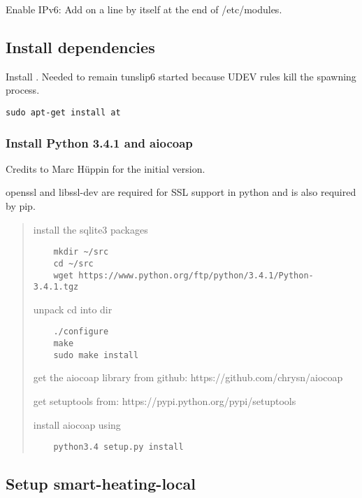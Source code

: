 Enable IPv6: Add  on a line by itself at the end of
/etc/modules.

\subsection{Install dependencies}\label{install-dependencies}

Install . Needed to remain tunslip6 started because UDEV
rules kill the spawning process.

\begin{verbatim}
sudo apt-get install at
\end{verbatim}

\subsubsection{Install Python 3.4.1 and	aiocoap}\label{install-python-3.4.1-and-aiocoap}

Credits to Marc Hüppin for the initial version.

openssl and libssl-dev are required for SSL support in python and is also required by pip.

\begin{quote}
	
	install the sqlite3 packages
	
	\begin{verbatim}
	mkdir ~/src
	cd ~/src
	wget https://www.python.org/ftp/python/3.4.1/Python-3.4.1.tgz
	\end{verbatim}
	
	unpack cd into dir
	
	\begin{verbatim}
	./configure
	make
	sudo make install
	\end{verbatim}
	
	get the aiocoap library from github: https://github.com/chrysn/aiocoap
	
	get setuptools from: https://pypi.python.org/pypi/setuptools
	
	install aiocoap using
	
	\begin{verbatim}
	python3.4 setup.py install
	\end{verbatim}
\end{quote}

\subsection{Setup smart-heating-local}\label{setup-smart-heating-local}

